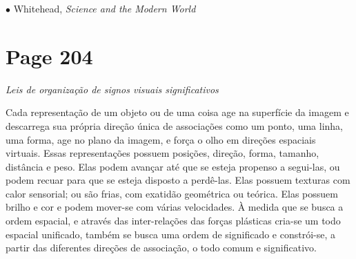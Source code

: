 \documentclass[a4paper]{article}
\begin{document}
\vspace{1em}
\noindent $\bullet$ Whitehead, \textit{Science and the Modern World}

\newpage
\section*{Page 204}

\centering \textit{Leis de organização de signos visuais significativos}
\par
\vspace{1em}

\noindent Cada representação de um objeto ou de uma coisa age na superfície da imagem e descarrega sua própria direção única de associações como um ponto, uma linha, uma forma, age no plano da imagem, e força o olho em direções espaciais virtuais. Essas representações possuem posições, direção, forma, tamanho, distância e peso. Elas podem avançar até que se esteja propenso a segui-las, ou podem recuar para que se esteja disposto a perdê-las. Elas possuem texturas com calor sensorial; ou são frias, com exatidão geométrica ou teórica. Elas possuem brilho e cor e podem mover-se com várias velocidades. À medida que se busca a ordem espacial, e através das inter-relações das forças plásticas cria-se um todo espacial unificado, também se busca uma ordem de significado e constrói-se, a partir das diferentes direções de associação, o todo comum e significativo.
\end{document}
